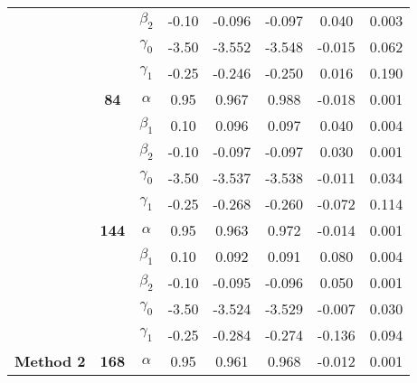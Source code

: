 \begin{table}[h]
\begin{tabular}[t]{>{}c>{}ccccccc}
 &  & $\beta_2$ & -0.10 & -0.096 & -0.097 & 0.040 & 0.003\\

 &  & $\gamma_0$ & -3.50 & -3.552 & -3.548 & -0.015 & 0.062\\

 &  & $\gamma_1$ & -0.25 & -0.246 & -0.250 & 0.016 & 0.190\\

 & \multirow{-5}{*}{\centering\arraybackslash \textbf{84}} & $\alpha$ & 0.95 & 0.967 & 0.988 & -0.018 & 0.001\\

 &  & $\beta_1$ & 0.10 & 0.096 & 0.097 & 0.040 & 0.004\\

 &  & $\beta_2$ & -0.10 & -0.097 & -0.097 & 0.030 & 0.001\\

 &  & $\gamma_0$ & -3.50 & -3.537 & -3.538 & -0.011 & 0.034\\

 &  & $\gamma_1$ & -0.25 & -0.268 & -0.260 & -0.072 & 0.114\\

 & \multirow{-5}{*}{\centering\arraybackslash \textbf{144}} & $\alpha$ & 0.95 & 0.963 & 0.972 & -0.014 & 0.001\\

 &  & $\beta_1$ & 0.10 & 0.092 & 0.091 & 0.080 & 0.004\\

 &  & $\beta_2$ & -0.10 & -0.095 & -0.096 & 0.050 & 0.001\\

 &  & $\gamma_0$ & -3.50 & -3.524 & -3.529 & -0.007 & 0.030\\

 &  & $\gamma_1$ & -0.25 & -0.284 & -0.274 & -0.136 & 0.094\\

\multirow{-15}{*}{\centering\arraybackslash \textbf{Method 2}} & \multirow{-5}{*}{\centering\arraybackslash \textbf{168}} & $\alpha$ & 0.95 & 0.961 & 0.968 & -0.012 & 0.001\\
\bottomrule
\end{tabular}
\end{table}

